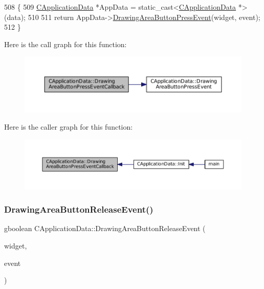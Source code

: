 \begin{DoxyCode}
508                                                                                                            
                \{
509     \hyperlink{classCApplicationData}{CApplicationData} *AppData = \textcolor{keyword}{static\_cast<}\hyperlink{classCApplicationData}{CApplicationData} *\textcolor{keyword}{>}(data);
510 
511     \textcolor{keywordflow}{return} AppData->\hyperlink{classCApplicationData_ae7516e29f629998e4068ae1584d0237c}{DrawingAreaButtonPressEvent}(widget, event);
512 \}
\end{DoxyCode}
Here is the call graph for this function\+:
\nopagebreak
\begin{figure}[H]
\begin{center}
\leavevmode
\includegraphics[width=350pt]{classCApplicationData_aaa867e992733fa1e88e67c026c8a2947_cgraph}
\end{center}
\end{figure}
Here is the caller graph for this function\+:
\nopagebreak
\begin{figure}[H]
\begin{center}
\leavevmode
\includegraphics[width=350pt]{classCApplicationData_aaa867e992733fa1e88e67c026c8a2947_icgraph}
\end{center}
\end{figure}
\hypertarget{classCApplicationData_a7df4d71ef6fabf7eac740c95cfe3cd81}{}\label{classCApplicationData_a7df4d71ef6fabf7eac740c95cfe3cd81} 
\subsubsection{\texorpdfstring{Drawing\+Area\+Button\+Release\+Event()}{DrawingAreaButtonReleaseEvent()}}
{\footnotesize\ttfamily gboolean C\+Application\+Data\+::\+Drawing\+Area\+Button\+Release\+Event (\begin{DoxyParamCaption}\item[{Gtk\+Widget $\ast$}]{widget,  }\item[{Gdk\+Event\+Button $\ast$}]{event }\end{DoxyParamCaption})\hspace{0.3cm}{\ttfamily [protected]}}



